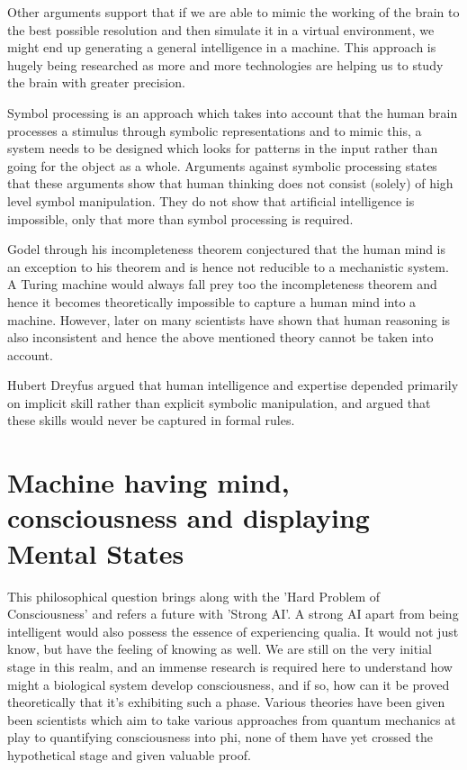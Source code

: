 \documentclass{article}
\begin{document}
Other arguments support that if we are able to mimic the working of the brain to the best possible resolution and then simulate it in a virtual environment, we might end up generating a general intelligence in a machine. This approach is hugely being researched as more and more technologies are helping us to study the brain with greater precision.

Symbol processing is an approach which takes into account that the human brain processes a stimulus through symbolic representations and to mimic this, a system needs to be designed which looks for patterns in the input rather than going for the object as a whole. Arguments against symbolic processing states that these arguments show that human thinking does not consist (solely) of high level symbol manipulation. They do not show that artificial intelligence is impossible, only that more than symbol processing is required.

Godel through his incompleteness theorem conjectured that the human mind is an exception to his theorem and is hence not reducible to a mechanistic system. A Turing machine would always fall prey too the incompleteness theorem and hence it becomes theoretically impossible to capture a human mind into a machine. However, later on many scientists have shown that human reasoning is also inconsistent and hence the above mentioned theory cannot be taken into account. 

Hubert Dreyfus argued that human intelligence and expertise depended primarily on implicit skill rather than explicit symbolic manipulation, and argued that these skills would never be captured in formal rules.

\section{Machine having mind, consciousness and displaying Mental States}
This philosophical question brings along with the 'Hard Problem of Consciousness' and refers a future with 'Strong AI'.
A strong AI apart from being intelligent would also possess the essence of experiencing qualia. It would not just know, but have the feeling of knowing as well. We are still on the very initial stage in this realm, and an immense research is required here to understand how might a biological system develop consciousness, and if so, how can it be proved theoretically that it's exhibiting such a phase. Various theories have been given been scientists which aim to take various approaches from quantum mechanics at play to quantifying consciousness into phi, none of them have yet crossed the hypothetical stage and given valuable proof.
\end{document}
